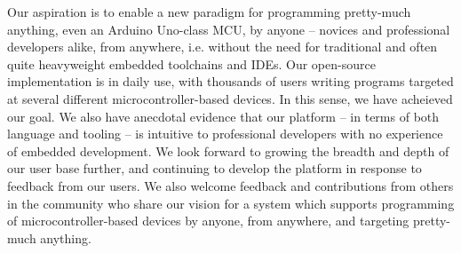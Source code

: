Our aspiration is to enable a new paradigm for programming pretty-much anything, even an Arduino Uno-class MCU, by anyone -- novices and professional developers alike, from anywhere, i.e. without the need for traditional and often quite heavyweight embedded toolchains and IDEs. Our open-source implementation is in daily use, with thousands of users writing programs targeted at several different microcontroller-based devices. In this sense, we have acheieved our goal. We also have anecdotal evidence that our platform -- in terms of both language and tooling -- is intuitive to professional developers with no experience of embedded development. We look forward to growing the breadth and depth of our user base further, and continuing to develop the platform in response to feedback from our users. We also welcome feedback and contributions from others in the community who share our vision for a system which supports programming of microcontroller-based devices by anyone, from anywhere, and targeting pretty-much anything.



